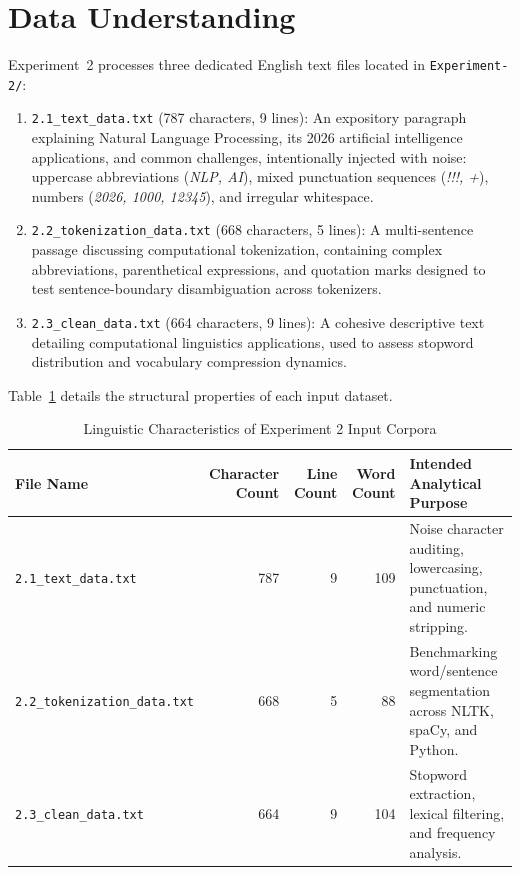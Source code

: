 \documentclass[12pt,a4paper]{report}
\begin{document}
\section{Data Understanding}
Experiment~2 processes three dedicated English text files located in \texttt{Experiment-2/}:
\begin{enumerate}
    \item \texttt{2.1\_text\_data.txt} (787 characters, 9 lines): An expository paragraph explaining Natural Language Processing, its 2026 artificial intelligence applications, and common challenges, intentionally injected with noise: uppercase abbreviations (\textit{NLP, AI}), mixed punctuation sequences (\textit{!!!, +}), numbers (\textit{2026, 1000, 12345}), and irregular whitespace.
    \item \texttt{2.2\_tokenization\_data.txt} (668 characters, 5 lines): A multi-sentence passage discussing computational tokenization, containing complex abbreviations, parenthetical expressions, and quotation marks designed to test sentence-boundary disambiguation across tokenizers.
    \item \texttt{2.3\_clean\_data.txt} (664 characters, 9 lines): A cohesive descriptive text detailing computational linguistics applications, used to assess stopword distribution and vocabulary compression dynamics.
\end{enumerate}

Table~\ref{tab:exp2_data_summary} details the structural properties of each input dataset.
\begin{table}[H]
\centering
\small
\caption{Linguistic Characteristics of Experiment 2 Input Corpora}
\label{tab:exp2_data_summary}
\begin{tabularx}{\textwidth}{lrrrp{5.5cm}}
\toprule
\textbf{File Name} & \textbf{Character Count} & \textbf{Line Count} & \textbf{Word Count} & \textbf{Intended Analytical Purpose} \\
\midrule
\texttt{2.1\_text\_data.txt} & 787 & 9 & 109 & Noise character auditing, lowercasing, punctuation, and numeric stripping. \\
\texttt{2.2\_tokenization\_data.txt} & 668 & 5 & 88 & Benchmarking word/sentence segmentation across NLTK, spaCy, and Python. \\
\texttt{2.3\_clean\_data.txt} & 664 & 9 & 104 & Stopword extraction, lexical filtering, and frequency analysis. \\
\bottomrule
\end{tabularx}
\end{table}
\end{document}
